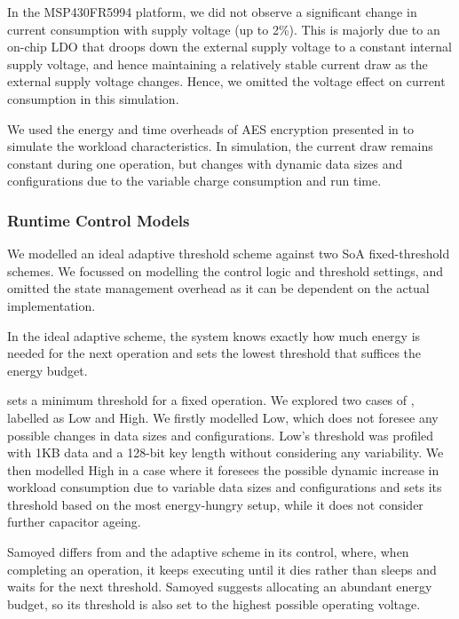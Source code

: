 

In the MSP430FR5994 platform, we did not observe a significant change in current consumption with supply voltage (up to 2\%). 
This is majorly due to an on-chip LDO that droops down the external supply voltage to a constant internal supply voltage, and hence maintaining a relatively stable current draw as the external supply voltage changes. 
Hence, we omitted the voltage effect on current consumption in this simulation. 

We used the energy and time overheads of AES encryption presented in  to simulate the workload characteristics. 
In simulation, the current draw remains constant during one operation, but changes with dynamic data sizes and configurations due to the variable charge consumption and run time.

\subsubsection{Runtime Control Models}

We modelled an ideal adaptive threshold scheme against two SoA fixed-threshold schemes.
We focussed on modelling the control logic and threshold settings, and omitted the state management overhead as it can be dependent on the actual implementation. 

In the ideal adaptive scheme, the system knows exactly how much energy is needed for the next operation and sets the lowest threshold that suffices the energy budget. 

\debs{} sets a minimum threshold for a fixed operation. 
We explored two cases of \debs{}, labelled as \debs{} Low and \debs{} High.
We firstly modelled \debs{} Low, which does not foresee any possible changes in data sizes and configurations. 
\debs{} Low's threshold was profiled with 1KB data and a 128-bit key length without considering any variability. 
We then modelled \debs{} High in a case where it foresees the possible dynamic increase in workload consumption due to variable data sizes and configurations and sets its threshold based on the most energy-hungry setup, while it does not consider further capacitor ageing.

Samoyed differs from \debs{} and the adaptive scheme in its control, where, when completing an operation, it keeps executing until it dies rather than sleeps and waits for the next threshold.
Samoyed suggests allocating an abundant energy budget, so its threshold is also set to the highest possible operating voltage.

